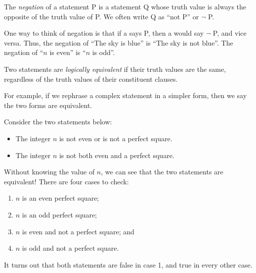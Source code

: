 \documentclass{tufte-book}
\begin{document}
\begin{definition}
  The \emph{negation} of a statement P is a statement Q whose truth value is always the opposite of the truth value of P. We often write Q as ``not P'' or $\neg$ P.
\end{definition}
One way to think of negation is that if a \knave says P, then a \knight would say $\neg$ P, and vice versa. Thus, the negation of ``The sky is blue'' is ``The sky is not blue''. The negation of ``$n$ is even'' is ``$n$ is odd''.

\begin{definition}
  Two statements are \emph{logically equivalent}  if their truth values are the same, regardless of the truth values of their constituent clauses. 
\end{definition}
For example, if we rephrase a complex statement in a simpler form, then we say the two forms are equivalent. 

\begin{example}
  Consider the two statements below:
  \begin{itemize}
      \item The integer $n$ is not even or is not a perfect square.
      \item The integer $n$ is not both even and a perfect square.
  \end{itemize}
  Without knowing the value of $n$, we can see that the two statements are equivalent! There are four cases to check:
  \begin{enumerate}
      \item $n$ is an even perfect square;
      \item $n$ is an odd perfect square;
      \item $n$ is even and not a perfect square; and
      \item $n$ is odd and not a perfect square.
  \end{enumerate}
  It turns out that both statements are false in case 1, and true in every other case.
\end{example}
\end{document}
